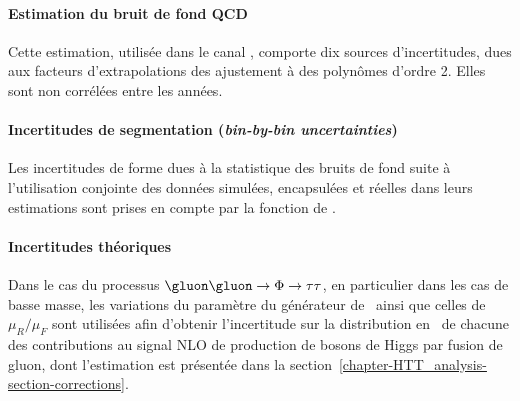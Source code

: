 \paragraph{Estimation du bruit de fond QCD}
Cette estimation, utilisée dans le canal \ele\mu, comporte dix sources d'incertitudes, dues aux facteurs d'extrapolations des ajustement à des polynômes d'ordre 2.
Elles sont non corrélées entre les années.
\paragraph{Incertitudes de segmentation (\emph{bin-by-bin uncertainties})}
Les incertitudes de forme dues à la statistique des bruits de fond suite à l'utilisation conjointe des données simulées, encapsulées et réelles dans leurs estimations sont prises en compte par la fonction  de \COMBINE.
\paragraph{Incertitudes théoriques}
Dans le cas du processus $\gluon\gluon\to\Phi\to\tau\tau$, en particulier dans les cas de basse masse,
les variations du paramètre  du générateur de \POWHEG\ ainsi que
celles de $\mu_R/\mu_F$ sont utilisées afin d'obtenir l'incertitude sur la distribution en \pT\ de chacune des contributions
au signal NLO de production de bosons de Higgs par fusion de gluon, dont l'estimation est présentée dans la section~\ref{chapter-HTT_analysis-section-corrections}.